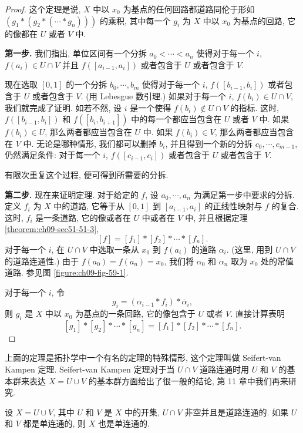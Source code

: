 \begin{proof}
这个定理是说, $X$ 中以 $x_0$ 为基点的任何回路都道路同伦于形如 $(g_1*(g_2*(\cdots*g_n)))$ 的乘积, 其中每一个 $g_i$ 为 $X$ 中以 $x_0$ 为基点的回路, 它的像都在 $U$ 或者 $V$ 中.

\textbf{第一步.} 我们指出, 单位区间有一个分拆 $a_0<\cdots<a_n$ 使得对于每一个 $i$, $f(a_i)\in U\cap V$ 并且 $f([a_{i-1},a_i])$ 或者包含于 $U$ 或者包含于 $V$.

现在选取 $[0,1]$ 的一个分拆 $b_0,\cdots,b_m$ 使得对于每一个 $i$, $f([b_{i-1},b_i])$ 或者包含于 $U$ 或者包含于 $V$. (用 Lebesgue 数引理.) 如果对于每一个 $i$, $f(b_i)\in U\cap V$, 我们就完成了证明. 如若不然, 设 $i$ 是一个使得 $f(b_i)\notin U\cap V$ 的指标. 这时, $f([b_{i-1},b_i])$ 和 $f([b_i,b_{i+1}])$ 中的每一个都应当包含在 $U$ 或者 $V$ 中. 如果 $f(b_i)\in U$, 那么两者都应当包含在 $U$ 中. 如果 $f(b_i)\in V$, 那么两者都应当包含在 $V$ 中. 无论是哪种情形, 我们都可以删掉 $b_i$, 并且得到一个新的分拆 $c_0,\cdots,c_{m-1}$, 仍然满足条件: 对于每一个 $i$, $f([c_{i-1},c_i])$ 或者包含于 $U$ 或者包含于 $V$.

有限次重复这个过程, 便可得到所需要的分拆.

\textbf{第二步.} 现在来证明定理. 对于给定的 $f$, 设 $a_0,\cdots,a_n$ 为满足第一步中要求的分拆. 定义 $f_i$ 为 $X$ 中的道路, 它等于从 $[0,1]$ 到 $[a_{i-1},a_i]$ 的正线性映射与 $f$ 的复合. 这时, $f_i$ 是一条道路, 它的像或者在 $U$ 中或者在 $V$ 中, 并且根据定理 \cref{theorem:ch09-sec51-51-3},
\[
[f]=[f_{1}]*[f_{2}]*\cdots*[f_{n}].
\]
对于每一个 $i$, 在 $U\cap V$ 中选取一条从 $x_0$ 到 $f(a_i)$ 的道路 $\alpha_i$. (这里, 用到 $U\cap V$ 的道路连通性.) 由于 $f(a_0)=f(a_n)=x_0$, 我们将 $\alpha_0$ 和 $\alpha_n$ 取为 $x_0$ 处的常值道路. 参见图 \cref{figure:ch09-fig-59-1}.


对于每一个 $i$, 令
\[
g_{i}=(\alpha_{i-1}*f_{i})*\bar{\alpha}_{i},
\]
则 $g_i$ 是 $X$ 中以 $x_0$ 为基点的一条回路, 它的像包含于 $U$ 或者 $V$. 直接计算表明
\[
[g_{1}]*[g_{2}]*\cdots*[g_{n}]=[f_{1}]*[f_{2}]*\cdots*[f_{n}].
\]
\end{proof}

上面的定理是拓扑学中一个有名的定理的特殊情形, 这个定理叫做 Seifert-van Kampen 定理. Seifert-van Kampen 定理对于当 $U\cap V$ 道路连通时用 $U$ 和 $V$ 的基本群来表达 $X=U\cup V$ 的基本群方面给出了很一般的结论, 第 11 章中我们再来研究.

\begin{corollary}
\label{corollary:ch09-sec59-59-2}
设 $X=U\cup V$, 其中 $U$ 和 $V$ 是 $X$ 中的开集, $U\cap V$ 非空并且是道路连通的. 如果 $U$ 和 $V$ 都是单连通的, 则 $X$ 也是单连通的.
\end{corollary}

